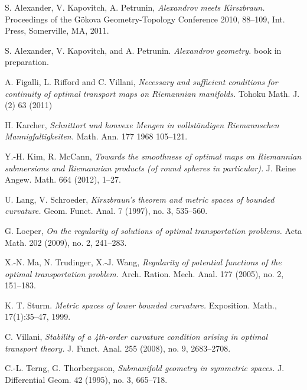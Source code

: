 \documentclass{article}
\begin{document}
\begin{thebibliography}{52}
 S. Alexander, V. Kapovitch, A. Petrunin, 
\emph{Alexandrov meets Kirszbraun.} 
Proceedings of the Gökova Geometry-Topology Conference 2010, 88--109, Int. Press, Somerville, MA, 2011.

 S. Alexander, V. Kapovitch, and A. Petrunin. \emph{Alexandrov geometry.} book in preparation.

 A. Figalli, L. Rifford and C. Villani,
\emph{Necessary and sufficient conditions for continuity of optimal transport maps on Riemannian manifolds.} Tohoku Math. J. (2) 63 (2011)

H. Karcher,
\emph{Schnittort und konvexe Mengen in vollständigen Riemannschen Mannigfaltigkeiten.}
Math. Ann. 177 1968 105--121.

 Y.-H. Kim, R. McCann,
\emph{Towards the smoothness of optimal maps on Riemannian submersions and Riemannian products (of round spheres in particular).}
J. Reine Angew. Math. 664 (2012), 1--27. 

 U. Lang, V. Schroeder,
\emph{Kirszbraun's theorem and metric spaces of bounded curvature.}
Geom. Funct. Anal. 7 (1997), no. 3, 535–560. 

G. Loeper, 
\emph{On the regularity of solutions of optimal transportation problems.}
Acta Math. 202 (2009), no. 2, 241–283. 

 X.-N. Ma, N. Trudinger,  X.-J. Wang, 
\emph{Regularity of potential functions of the optimal transportation problem.}
Arch. Ration. Mech. Anal. 177 (2005), no. 2, 151--183. 

 K. T. Sturm. \emph{Metric spaces of lower bounded curvature.} Exposition. Math., 17(1):35–47, 1999.

 C. Villani, \emph{Stability of a 4th-order curvature condition arising in optimal transport theory.}
J. Funct. Anal. 255 (2008), no. 9, 2683--2708.


 C.-L. Terng, G. Thorbergsson,  
\emph{Submanifold geometry in symmetric spaces.} J. Differential Geom. 42 (1995), no. 3, 665--718.
 
\end{thebibliography}
\end{document}
